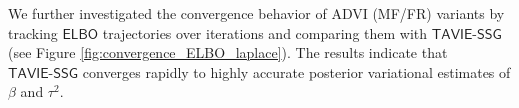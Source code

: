 \documentclass[12pt]{article}
\numberwithin{equation}{section}
\newcommand{\tssg}{\mathsf{TAVIE}\text{-}\mathsf{SSG}}
\begin{document}
We further investigated the convergence behavior of ADVI (MF/FR) variants by tracking $\mathsf{ELBO}$ trajectories over iterations and comparing them with $\tssg$ (see Figure \ref{fig:convergence_ELBO_laplace}). The results indicate that $\tssg$ converges rapidly to highly accurate posterior variational estimates of $\beta$ and $\tau^2$.

\end{document}

